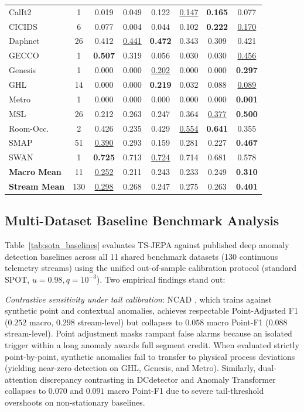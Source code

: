 \begin{table}[t]
\begin{tabular}{@{}lccccccc@{}}
CalIt2       &  1 & 0.019 & 0.049 & 0.122 & \underline{0.147} & \textbf{0.165} & 0.077 \\
CICIDS       &  6 & 0.077 & 0.004 & 0.044 & 0.102 & \textbf{0.222} & \underline{0.170} \\
Daphnet      & 26 & 0.412 & \underline{0.441} & \textbf{0.472} & 0.343 & 0.309 & 0.421 \\
GECCO        &  1 & \textbf{0.507} & 0.319 & 0.056 & 0.030 & 0.030 & \underline{0.456} \\
Genesis      &  1 & 0.000 & 0.000 & \underline{0.202} & 0.000 & 0.000 & \textbf{0.297} \\
GHL          & 14 & 0.000 & 0.000 & \textbf{0.219} & 0.032 & 0.088 & \underline{0.089} \\
Metro        &  1 & 0.000 & 0.000 & 0.000 & 0.000 & 0.000 & \textbf{0.001} \\
MSL          & 26 & 0.212 & 0.263 & 0.247 & 0.364 & \underline{0.377} & \textbf{0.500} \\
Room-Occ.    &  2 & 0.426 & 0.235 & 0.429 & \underline{0.554} & \textbf{0.641} & 0.355 \\
SMAP         & 51 & \underline{0.390} & 0.293 & 0.159 & 0.281 & 0.227 & \textbf{0.467} \\
SWAN         &  1 & \textbf{0.725} & 0.713 & \underline{0.724} & 0.714 & 0.681 & 0.578 \\
\midrule
\textbf{Macro Mean}  & 11  & \underline{0.252} & 0.211 & 0.243 & 0.233 & 0.249 & \textbf{0.310} \\
\textbf{Stream Mean} & 130 & \underline{0.298} & 0.268 & 0.247 & 0.275 & 0.263 & \textbf{0.401} \\
\bottomrule
\end{tabular}
\end{table}

\subsection{Multi-Dataset Baseline Benchmark Analysis}
Table~\ref{tab:sota_baselines} evaluates TS-JEPA against published deep anomaly detection baselines across all 11 shared benchmark datasets (130 continuous telemetry streams) using the unified out-of-sample calibration protocol (standard SPOT, $u=0.98, q=10^{-3}$). Two empirical findings stand out:

\emph{Contrastive sensitivity under tail calibration}: NCAD \cite{carmona2021neural}, which trains against synthetic point and contextual anomalies, achieves respectable Point-Adjusted F1 ($0.252$ macro, $0.298$ stream-level) but collapses to $0.058$ macro Point-F1 ($0.088$ stream-level). Point adjustment masks rampant false alarms because an isolated trigger within a long anomaly awards full segment credit. When evaluated strictly point-by-point, synthetic anomalies fail to transfer to physical process deviations (yielding near-zero detection on GHL, Genesis, and Metro). Similarly, dual-attention discrepancy contrasting in DCdetector \cite{yang2023dcdetector} and Anomaly Transformer \cite{xu2022anomaly} collapses to $0.070$ and $0.091$ macro Point-F1 due to severe tail-threshold overshoots on non-stationary baselines.


